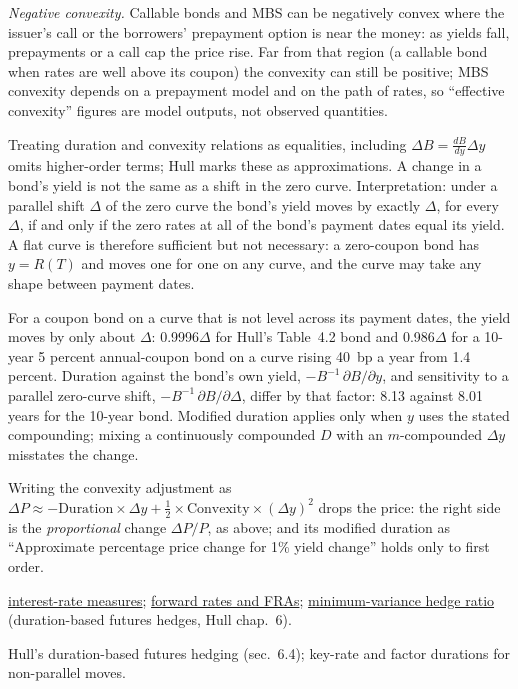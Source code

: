 \begin{qfmodel}
\emph{Negative convexity.} Callable bonds and MBS can be negatively convex where the issuer's call or the borrowers' prepayment option is near the money: as yields fall, prepayments or a call cap the price rise. Far from that region (a callable bond when rates are well above its coupon) the convexity can still be positive; MBS convexity depends on a prepayment model and on the path of rates, so ``effective convexity'' figures are model outputs, not observed quantities.

 Treating duration and convexity relations as equalities, including $\Delta B=\frac{dB}{dy}\Delta y$ omits higher-order terms; Hull marks these as approximations. A change in a bond's yield is not the same as a shift in the zero curve. Interpretation: under a parallel shift $\Delta$ of the zero curve the bond's yield moves by exactly $\Delta$, for every $\Delta$, if and only if the zero rates at all of the bond's payment dates equal its yield. A flat curve is therefore sufficient but not necessary: a zero-coupon bond has $y=R(T)$ and moves one for one on any curve, and the curve may take any shape between payment dates.

For a coupon bond on a curve that is not level across its payment dates, the yield moves by only about $\Delta$: 0.9996$\Delta$ for Hull's Table~4.2 bond and 0.986$\Delta$ for a 10-year 5 percent annual-coupon bond on a curve rising 40~bp a year from 1.4 percent. Duration against the bond's own yield, $-B^{-1}\,\partial B/\partial y$, and sensitivity to a parallel zero-curve shift, $-B^{-1}\,\partial B/\partial\Delta$, differ by that factor: 8.13 against 8.01 years for the 10-year bond. Modified duration applies only when $y$ uses the stated compounding; mixing a continuously compounded $D$ with an $m$-compounded $\Delta y$ misstates the change.

Writing the convexity adjustment as $\Delta P\approx-\text{Duration}\times\Delta y+\tfrac12\times\text{Convexity}\times(\Delta y)^2$ drops the price: the right side is the \emph{proportional} change $\Delta P/P$, as above; and its modified duration as ``Approximate percentage price change for 1\% yield change'' holds only to first order.

 \hyperref[def:interest-rate-measures]{interest-rate measures}; \hyperref[mod:forward-rates-fra]{forward rates and FRAs}; \hyperref[mod:minimum-variance-hedge-ratio]{minimum-variance hedge ratio} (duration-based futures hedges, Hull chap.~6).

 Hull's duration-based futures hedging (sec.~6.4); key-rate and factor durations for non-parallel moves.

\end{qfmodel}

